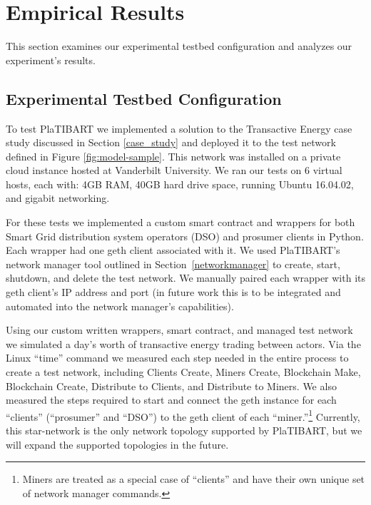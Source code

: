 
%
%

\section{Empirical Results}
\label{empirical}
This section examines our experimental testbed configuration and analyzes our experiment's results.
\subsection{Experimental Testbed Configuration}

To test PlaTIBART we implemented a solution to the Transactive Energy case study discussed in Section \ref{case_study} and deployed it to the test network defined in Figure \ref{fig:model-sample}. This network was installed on a private cloud instance hosted at Vanderbilt University. We ran our tests on 6 virtual hosts, each with: 4GB RAM, 40GB hard drive space, running Ubuntu 16.04.02, and gigabit networking.

For these tests we implemented a custom smart contract and wrappers for both Smart Grid distribution system operators (DSO) and prosumer clients in Python. Each wrapper had one geth client associated with it. We used PlaTIBART's network manager tool outlined in Section~\ref{networkmanager} to create, start, shutdown, and delete the test network. We manually paired each wrapper with its geth client's IP address and port (in future work this is to be integrated and automated into the network manager's capabilities).  

Using our custom written wrappers, smart contract, and managed test network we simulated a day's worth of transactive energy trading between actors. Via the Linux ``time'' command we measured each step needed in the entire process to create a test network, including Clients Create, Miners Create, Blockchain Make, Blockchain Create, Distribute to Clients, and Distribute to Miners. We also measured the steps required to start and connect the geth instance for each ``clients'' (``prosumer'' and ``DSO'') to the geth client of each ``miner.''\footnote{Miners are treated as a special case of ``clients'' and have their own unique set of network manager commands.} Currently, this star-network is the only network topology supported by PlaTIBART, but we will expand the supported topologies in the future. 


